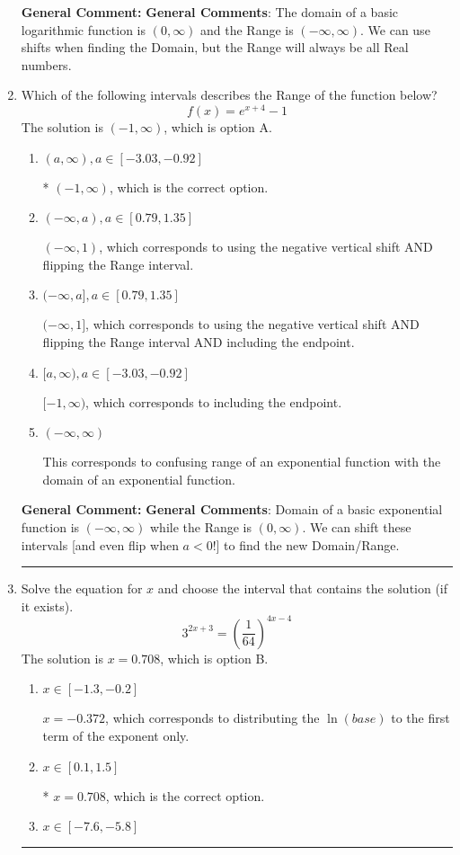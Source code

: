 \documentclass{extbook}[14pt]
\newcommand{\litem}[1]{\item #1

\rule{\textwidth}{0.4pt}}
\begin{document}
\begin{enumerate}
{\textbf{General Comment:} \textbf{General Comments}: The domain of a basic logarithmic function is $(0, \infty)$ and the Range is $(-\infty, \infty)$. We can use shifts when finding the Domain, but the Range will always be all Real numbers.
}
\litem{
Which of the following intervals describes the Range of the function below?
\[ f(x) = e^{x+4}-1 \]The solution is \( (-1, \infty) \), which is option A.\begin{enumerate}[label=\Alph*.]
\item \( (a, \infty), a \in [-3.03, -0.92] \)

* $(-1, \infty)$, which is the correct option.
\item \( (-\infty, a), a \in [0.79, 1.35] \)

$(-\infty, 1)$, which corresponds to using the negative vertical shift AND flipping the Range interval.
\item \( (-\infty, a], a \in [0.79, 1.35] \)

$(-\infty, 1]$, which corresponds to using the negative vertical shift AND flipping the Range interval AND including the endpoint.
\item \( [a, \infty), a \in [-3.03, -0.92] \)

$[-1, \infty)$, which corresponds to including the endpoint.
\item \( (-\infty, \infty) \)

This corresponds to confusing range of an exponential function with the domain of an exponential function.
\end{enumerate}

\textbf{General Comment:} \textbf{General Comments}: Domain of a basic exponential function is $(-\infty, \infty)$ while the Range is $(0, \infty)$. We can shift these intervals [and even flip when $a<0$!] to find the new Domain/Range.
}
\litem{
Solve the equation for $x$ and choose the interval that contains the solution (if it exists).
\[ 3^{2x+3} = \left(\frac{1}{64}\right)^{4x-4} \]The solution is \( x = 0.708 \), which is option B.\begin{enumerate}[label=\Alph*.]
\item \( x \in [-1.3, -0.2] \)

$x = -0.372$, which corresponds to distributing the $\ln(base)$ to the first term of the exponent only.
\item \( x \in [0.1, 1.5] \)

* $x = 0.708$, which is the correct option.
\item \( x \in [-7.6, -5.8] \)


\end{enumerate}}
\end{enumerate}
\end{document}
